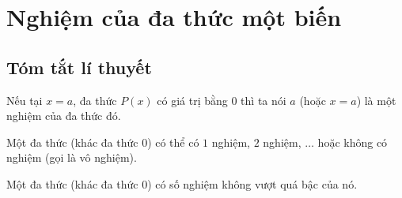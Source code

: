 \section{Nghiệm của đa thức một biến}
\subsection{Tóm tắt lí thuyết}
\begin{dn}
	Nếu tại $ x = a $, đa thức $ P(x) $ có giá trị bằng $ 0 $ thì ta nói $ a $ (hoặc $ x = a $) là một nghiệm của đa thức đó.
\end{dn}
\begin{note}
	Một đa thức (khác đa thức $ 0 $) có thể có $ 1 $ nghiệm, $ 2 $ nghiệm, $ \dots $ hoặc không có nghiệm (gọi là vô nghiệm).
\end{note}
\begin{dl}
	Một đa thức (khác đa thức $ 0 $) có số nghiệm không vượt quá bậc của nó.
\end{dl}

